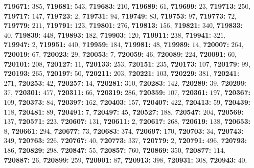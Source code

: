 \textsf{\bfseries 719671:} $385$, \textsf{\bfseries 719681:} $543$, \textsf{\bfseries 719683:} $210$, \textsf{\bfseries 719689:} $61$, \textsf{\bfseries 719699:} $23$, \textsf{\bfseries 719713:} $250$, \textsf{\bfseries 719717:} $147$, \textsf{\bfseries 719723:} $2$, \textsf{\bfseries 719731:} $94$, \textsf{\bfseries 719749:} $83$, \textsf{\bfseries 719753:} $97$, \textsf{\bfseries 719773:} $72$, \textsf{\bfseries 719779:} $211$, \textsf{\bfseries 719791:} $123$, \textsf{\bfseries 719801:} $276$, \textsf{\bfseries 719813:} $156$, \textsf{\bfseries 719821:} $340$, \textsf{\bfseries 719833:} $40$, \textsf{\bfseries 719839:} $448$, \textsf{\bfseries 719893:} $182$, \textsf{\bfseries 719903:} $120$, \textsf{\bfseries 719911:} $238$, \textsf{\bfseries 719941:} $321$, \textsf{\bfseries 719947:} $2$, \textsf{\bfseries 719951:} $440$, \textsf{\bfseries 719959:} $184$, \textsf{\bfseries 719981:} $48$, \textsf{\bfseries 719989:} $14$, \textsf{\bfseries 720007:} $264$, \textsf{\bfseries 720019:} $67$, \textsf{\bfseries 720023:} $29$, \textsf{\bfseries 720053:} $7$, \textsf{\bfseries 720059:} $46$, \textsf{\bfseries 720089:} $224$, \textsf{\bfseries 720091:} $60$, \textsf{\bfseries 720101:} $208$, \textsf{\bfseries 720127:} $11$, \textsf{\bfseries 720133:} $253$, \textsf{\bfseries 720151:} $235$, \textsf{\bfseries 720173:} $107$, \textsf{\bfseries 720179:} $99$, \textsf{\bfseries 720193:} $265$, \textsf{\bfseries 720197:} $50$, \textsf{\bfseries 720211:} $203$, \textsf{\bfseries 720221:} $103$, \textsf{\bfseries 720229:} $381$, \textsf{\bfseries 720241:} $271$, \textsf{\bfseries 720253:} $42$, \textsf{\bfseries 720257:} $14$, \textsf{\bfseries 720281:} $310$, \textsf{\bfseries 720283:} $142$, \textsf{\bfseries 720289:} $39$, \textsf{\bfseries 720299:} $37$, \textsf{\bfseries 720301:} $477$, \textsf{\bfseries 720311:} $66$, \textsf{\bfseries 720319:} $286$, \textsf{\bfseries 720359:} $107$, \textsf{\bfseries 720361:} $197$, \textsf{\bfseries 720367:} $109$, \textsf{\bfseries 720373:} $84$, \textsf{\bfseries 720397:} $162$, \textsf{\bfseries 720403:} $157$, \textsf{\bfseries 720407:} $422$, \textsf{\bfseries 720413:} $59$, \textsf{\bfseries 720439:} $118$, \textsf{\bfseries 720481:} $89$, \textsf{\bfseries 720491:} $7$, \textsf{\bfseries 720497:} $45$, \textsf{\bfseries 720527:} $188$, \textsf{\bfseries 720547:} $204$, \textsf{\bfseries 720569:} $137$, \textsf{\bfseries 720571:} $223$, \textsf{\bfseries 720607:} $131$, \textsf{\bfseries 720611:} $2$, \textsf{\bfseries 720617:} $268$, \textsf{\bfseries 720619:} $138$, \textsf{\bfseries 720653:} $8$, \textsf{\bfseries 720661:} $294$, \textsf{\bfseries 720677:} $73$, \textsf{\bfseries 720683:} $374$, \textsf{\bfseries 720697:} $170$, \textsf{\bfseries 720703:} $34$, \textsf{\bfseries 720743:} $349$, \textsf{\bfseries 720763:} $226$, \textsf{\bfseries 720767:} $40$, \textsf{\bfseries 720773:} $337$, \textsf{\bfseries 720779:} $2$, \textsf{\bfseries 720791:} $496$, \textsf{\bfseries 720793:} $186$, \textsf{\bfseries 720829:} $298$, \textsf{\bfseries 720847:} $55$, \textsf{\bfseries 720857:} $760$, \textsf{\bfseries 720869:} $350$, \textsf{\bfseries 720877:} $114$, \textsf{\bfseries 720887:} $26$, \textsf{\bfseries 720899:} $259$, \textsf{\bfseries 720901:} $87$, \textsf{\bfseries 720913:} $398$, \textsf{\bfseries 720931:} $308$, \textsf{\bfseries 720943:} $40$, 
